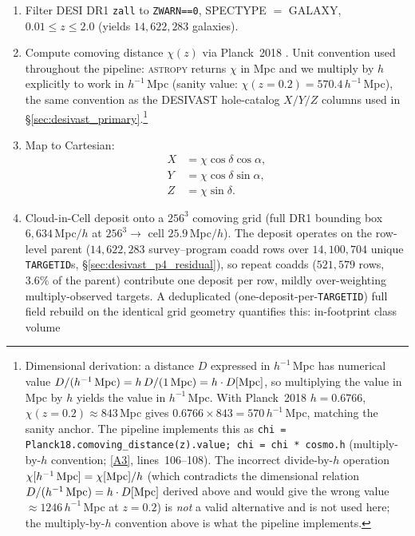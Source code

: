 \documentclass[twocolumn,linenumbers]{aastex702}
\newcommand{\repoBase}{https://github.com/Hubify-Projects/bigbounce/blob/main}
\begin{document}
\begin{enumerate}
\item Filter DESI DR1 \texttt{zall} to \texttt{ZWARN==0}, SPECTYPE
$=$ GALAXY, $0.01 \le z \le 2.0$ (yields $14{,}622{,}283$ galaxies).
\item Compute comoving distance $\chi(z)$ via Planck~2018
\cite{Planck2018cosmoparams}. Unit convention used throughout the
pipeline: \textsc{astropy} returns $\chi$ in Mpc and we multiply by
$h$ explicitly to work in $h^{-1}$\,Mpc (sanity value:
$\chi(z\!=\!0.2) = 570.4\,h^{-1}$\,Mpc), the same convention as the
DESIVAST hole-catalog $X/Y/Z$ columns used in
\S\ref{sec:desivast_primary}.\footnote{Dimensional derivation:
a distance $D$ expressed in $h^{-1}$\,Mpc has numerical value
$D/(h^{-1}\,{\rm Mpc}) = h\,D/(1\,{\rm Mpc}) = h\cdot D[{\rm Mpc}]$, so
multiplying the value in Mpc by $h$ yields the value in $h^{-1}$\,Mpc.
With Planck~2018 $h=0.6766$, $\chi(z\!=\!0.2)\!\approx\!843$\,Mpc gives
$0.6766 \times 843 = 570\,h^{-1}$\,Mpc, matching the sanity anchor.
The pipeline implements this as
\texttt{chi = Planck18.comoving\_distance(z).value;
chi = chi * cosmo.h} (multiply-by-$h$ convention;
\href{\repoBase/pipelines/p5\_desi\_chirality/env\_finder/01\_compute\_vweb.py}{[A3]},
lines~106--108). The incorrect divide-by-$h$ operation
$\chi[h^{-1}\,{\rm Mpc}] = \chi[{\rm Mpc}]/h$ (which contradicts the
dimensional relation $D/(h^{-1}\,{\rm Mpc}) = h\cdot D[{\rm Mpc}]$ derived
above and would give the wrong value ${\approx}1246\,h^{-1}$\,Mpc at
$z=0.2$) is \emph{not} a valid alternative and is not used here; the
multiply-by-$h$ convention above is what the pipeline implements.}
\item Map to Cartesian:
\[
\begin{aligned}
X &= \chi\cos\delta\cos\alpha, \\
Y &= \chi\cos\delta\sin\alpha, \\
Z &= \chi\sin\delta.
\end{aligned}
\]
\item Cloud-in-Cell deposit onto a $256^3$ comoving grid (full DR1
bounding box $6{,}634$\,Mpc$/h$ at $256^3 \to$ cell $25.9$\,Mpc$/h$).
The deposit operates on the row-level parent ($14{,}622{,}283$
survey--program coadd rows over $14{,}100{,}704$ unique
\texttt{TARGETID}s, \S\ref{sec:desivast_p4_residual}), so repeat
coadds ($521{,}579$ rows, $3.6\%$ of the parent) contribute one
deposit per row, mildly over-weighting multiply-observed targets. A
deduplicated (one-deposit-per-\texttt{TARGETID}) full field rebuild on
the identical grid geometry quantifies this: in-footprint class volume

\end{enumerate}
\end{document}
